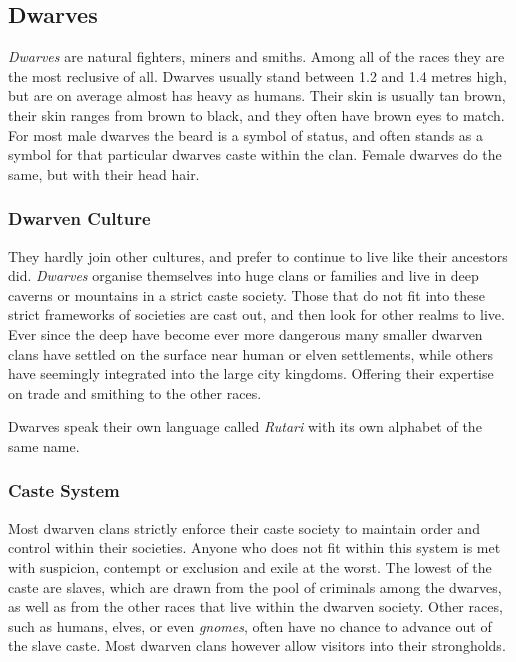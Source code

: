 \subsection*{Dwarves}

\emph{Dwarves} are natural fighters, miners and smiths. Among all of the races
they are the most reclusive of all. Dwarves usually stand between 1.2 and 1.4
metres high, but are on average almost has heavy as humans. Their skin is
usually tan brown, their skin ranges from brown to black, and they often have
brown eyes to match. For most male dwarves the beard is a symbol of status,
and often stands as a symbol for that particular dwarves caste within the clan.
Female dwarves do the same, but with their head hair.

\subsubsection*{Dwarven Culture}

They hardly join other cultures, and prefer to continue to live like their
ancestors did. \emph{Dwarves} organise themselves into huge clans or families
and live in deep caverns or mountains in a strict caste society. Those that do
not fit into these strict frameworks of societies are cast out, and then look
for other realms to live. Ever since the deep have become ever more dangerous
many smaller dwarven clans have settled on the surface near human or elven
settlements, while others have seemingly integrated into the large city
kingdoms. Offering their expertise on trade and smithing to the other races.

Dwarves speak their own language called \emph{Rutari} with its own alphabet of
the same name.

\subsubsection*{Caste System}

Most dwarven clans strictly enforce their caste society to maintain order and
control within their societies. Anyone who does not fit within this system is
met with suspicion, contempt or exclusion and exile at the worst. The lowest
of the caste are slaves, which are drawn from the pool of criminals among the
dwarves, as well as from the other races that live within the dwarven society.
Other races, such as humans, elves, or even \emph{gnomes}, often have no chance
to advance out of the slave caste. Most dwarven clans however allow visitors
into their strongholds.


